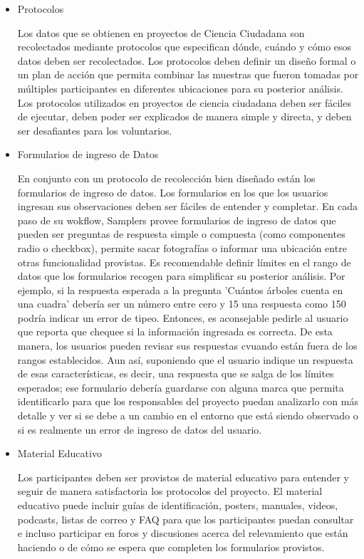 \begin{itemize}
	\item {Protocolos}	
			
			Los datos que se obtienen en proyectos de Ciencia Ciudadana son recolectados mediante protocolos que especifican dónde, cuándo y cómo esos datos deben ser recolectados. Los protocolos deben definir un diseño formal o un plan de acción que permita combinar las muestras que fueron tomadas por múltiples participantes en diferentes ubicaciones para su posterior análisis. Los protocolos utilizados en proyectos de ciencia ciudadana deben ser fáciles de ejecutar, deben poder ser explicados de manera simple y directa, y deben ser desafiantes para los voluntarios.		
		
	\item {Formularios de ingreso de Datos}	
			
			En conjunto con un protocolo de recolección bien diseñado están los formularios de ingreso de datos. Los formularios en los que los usuarios ingresan sus observaciones deben ser fáciles de entender y completar. En cada paso de su wokflow, Samplers provee formularios de ingreso de datos que pueden ser preguntas de respuesta simple o compuesta (como componentes radio o checkbox), permite sacar fotografías o informar una ubicación entre otras funcionalidad provistas. 
			Es recomendable definir límites en el rango de datos que los formularios recogen para simplificar su posterior análisis. Por ejemplo, si la respuesta esperada a la pregunta 'Cuántos árboles cuenta en una cuadra' debería ser un número entre cero y 15 una respuesta como 150 podría indicar un error de tipeo. Entonces, es aconsejable pedirle al usuario que reporta que chequee si la información ingresada es correcta. De esta manera, los usuarios pueden revisar sus respuestas cvuando están fuera de los rangos establecidos. Aun así, suponiendo que el usuario indique un respuesta de esas características, es decir, una respuesta que se salga de los límites esperados; ese formulario debería guardarse con alguna marca que permita identificarlo para que los responsables del proyecto puedan analizarlo con más detalle y ver si se debe a un cambio en el entorno que está siendo observado o si es realmente un error de ingreso de datos del usuario.
			
	\item {Material Educativo}
		
		Los participantes deben ser provistos de material educativo para entender y seguir de manera satisfactoria los protocolos del proyecto. El material educativo puede incluir guías de identificación, posters, manuales, videos, podcasts, listas de correo y FAQ para que los participantes puedan consultar e incluso participar en foros y discusiones acerca del relevamiento que están haciendo o de cómo se espera que completen los formularios provistos. \cite{bonney2009citizen}
		
		
\end{itemize} 

